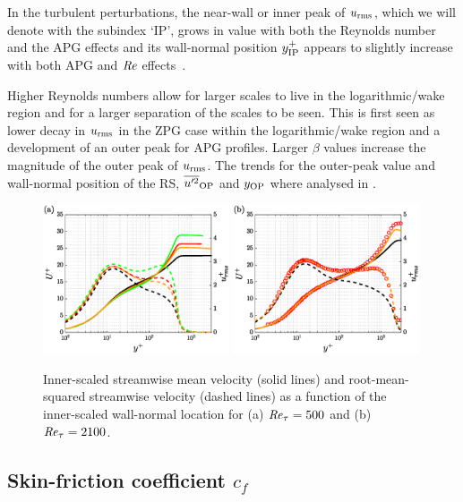 In the turbulent perturbations, the near-wall or inner peak of $u_{\rm rms}$, which
we will denote with the subindex `IP', grows in value with both the Reynolds number and the APG effects and its wall-normal position $y_{\rm IP}^+$ appears to slightly increase with both APG and $\mbox{\textit{Re}}$ effects~\citep{Pozuelo_JFM_22}.

Higher Reynolds numbers allow for larger scales to live in the logarithmic/wake region and for a larger separation of the scales to be seen. This is first seen as lower decay in $u_{\rm rms}$ in the ZPG case within the logarithmic/wake region and a development of an outer peak for APG profiles. Larger $\beta$ values increase the magnitude of the outer peak of $u_{\rm rms}$. The trends for the outer-peak value and wall-normal position of the RS,  $\overline{u^{\prime}\mkern-1.2mu^2}_{\rm OP}$ and $y_{\rm OP}$ where analysed in \cite{Pozuelo_JFM_22}. 


\begin{figure}
    \centering
    \includegraphics[width=0.49\textwidth]{imgs/stats/U_uu_a.eps}
    \includegraphics[width=0.49\textwidth]{imgs/stats/U_uu_b.eps}
    \caption{Inner-scaled streamwise mean velocity (solid lines) and root-mean-squared streamwise velocity (dashed lines) as a function of the inner-scaled wall-normal location for (a) $\mbox{\textit{Re}}_{\tau}=500$ and (b) $\mbox{\textit{Re}}_{\tau}=2100$. }
    \label{fig:U_uu_cap2}
\end{figure}

\subsection{Skin-friction coefficient $c_f$}

